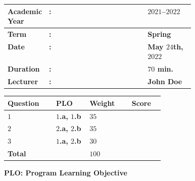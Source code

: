 \documentclass[a4paper, 11pt]{article}
\begin{document}
	\begin{table}[!ht]
		\renewcommand{\arraystretch}{1.1}
		\centering
		\begin{tabular}{@{}>{\bfseries}L{0.18\linewidth}>{\bfseries}C{0.00\linewidth}>{\bfseries}L{0.25\linewidth}@{}}
			\toprule
			Academic Year  & : & $2021$--$2022$                  \\ 
			\midrule
			Term         & : & \textbf{Spring}                             \\ 
			\midrule
			Date         & : & May $24$th, $2022$                           \\ 
			\midrule
			Duration          & : & $70$ \textbf{min.}                \\
			\midrule
			Lecturer & : & \textbf{John Doe} \\
			\bottomrule
		\end{tabular}
		\hfill
		\renewcommand{\arraystretch}{1.1}
		\begin{tabular}{>{\bfseries}C{0.1\linewidth}>{\bfseries}C{0.1\linewidth}>{\bfseries}C{0.1\linewidth}>{\bfseries}C{0.06\linewidth}}
			Question & PLO      & Weight & Score \\
			\toprule
			$1$ & $1$.a, $1$.b & $35$    & ~   \\
			\midrule
			$2$ & $2$.a, $2$.b & $35$    & ~   \\
			\midrule
			$3$ & $1$.a, $2$.b & $30$    & ~   \\
			\midrule
			Total    & ~              		  & $100$   & ~   \\
			\bottomrule
		\end{tabular}
		\vspace{-0.3cm}
		\begin{flushright}
			\textbf{PLO: Program Learning Objective}
		\end{flushright}
	\end{table}
	\vspace{-1cm}
	
\end{document}
